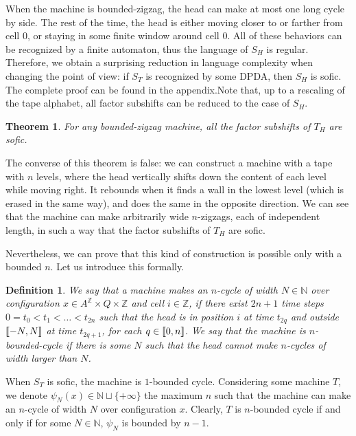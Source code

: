 \documentclass{llncs}
\newtheorem{teo}{Theorem}
\newtheorem{defi}{Definition}
\newcommand{\az}{A^\Zset}
\newcommand{\Zset}{{\mathbb Z}}
\newcommand{\Nset}{{\mathbb N}}
\begin{document}
When the machine is bounded-zigzag, the head can make at most one long cycle by side.
The rest of the time, the head is either moving closer to or farther from cell $0$, or staying in some finite window around cell $0$.
All of these behaviors can be recognized by a finite automaton, thus the language of $S_H$ is regular.
Therefore, we obtain a surprising reduction in language complexity when changing the point of view: if $S_T$ is recognized by some DPDA, then $S_H$ is sofic. The complete proof can be found in the appendix.Note that, up to a rescaling of the tape alphabet, all factor subshifts can be reduced to the case of $S_H$.
\begin{teo}\label{t:zigsof}
 For any bounded-zigzag machine, all the factor subshifts of $T_H$ are sofic.
\end{teo}
The converse of this theorem is false: we can construct a machine with a tape with $n$ levels, where the head vertically shifts down the content of each level while moving right.
It rebounds when it finds a wall in the lowest level (which is erased in the same way), and does the same in the opposite direction.
We can see that the machine can make arbitrarily wide $n$-zigzags, each of independent length, in such a way that the factor subshifts of $T_H$ are sofic.

Nevertheless, we can prove that this kind of construction is possible only with a bounded $n$.
Let us introduce this formally.
\begin{defi}
 We say that a machine makes an \emph{$n$-cycle} of width $N\in\Nset$ over configuration $x\in\az\times Q\times\Zset$ and cell $i\in\Zset$, if there exist $2n+1$ time steps $0=t_0<t_1<\ldots<t_{2n}$ such that the head is in position $i$ at time $t_{2q}$ and outside $\left\llbracket -N,N\right\rrbracket$ at time $t_{2q+1}$, for each $q\in\left\llbracket 0,n\right\rrbracket$.
We say that the machine is $n$-bounded-cycle if there is some $N$ such that the head cannot make $n$-cycles of width larger than $N$.
\end{defi}
When $S_T$ is sofic, the machine is $1$-bounded cycle.
Considering some machine $T$, we denote $\psi_N(x)\in\Nset\sqcup\{+\infty\}$ the maximum $n$ such that the machine can make an $n$-cycle of width $N$ over configuration $x$.
Clearly, $T$ is $n$-bounded cycle if and only if for some $N\in\Nset$, $\psi_N$ is bounded by $n-1$.
\end{document}
